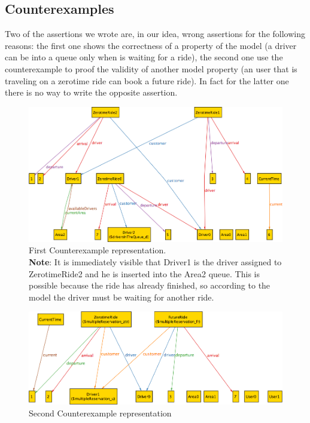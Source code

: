 \subsection{Counterexamples}
Two of the assertions we wrote are, in our idea, wrong assertions for the following reasons: the first one shows the correctness of a property of the model (a driver can be into a queue only when is waiting for a ride), the second one use the counterexample to proof the validity of another model property (an user that is traveling on a zerotime ride can book a future ride). In fact for the latter one there is no way to write the opposite assertion.

\label{cex1}
\begin{figure}[h!]
	\centerline{\includegraphics[width=\textheight, angle=90]{./figures/ALLOY_FirstAssertionCounterexample.png}}
	\caption{First Counterexample representation.\\
			\textbf{Note}: It is immediately visible that Driver1 is the driver assigned to ZerotimeRide2 and he is inserted into the Area2 queue. This is possible because the ride has already finished, so according to the model the driver must be waiting for another ride.}
	\label{cex1fig}
\end{figure}

\clearpage

\label{cex2}
\begin{figure}[h!]
	\centerline{\includegraphics[width=\textheight, angle=90]{./figures/ALLOY_SecondAssertionCounterexample.png}}
	\caption{Second Counterexample representation}
	\label{cex2fig}
\end{figure}

